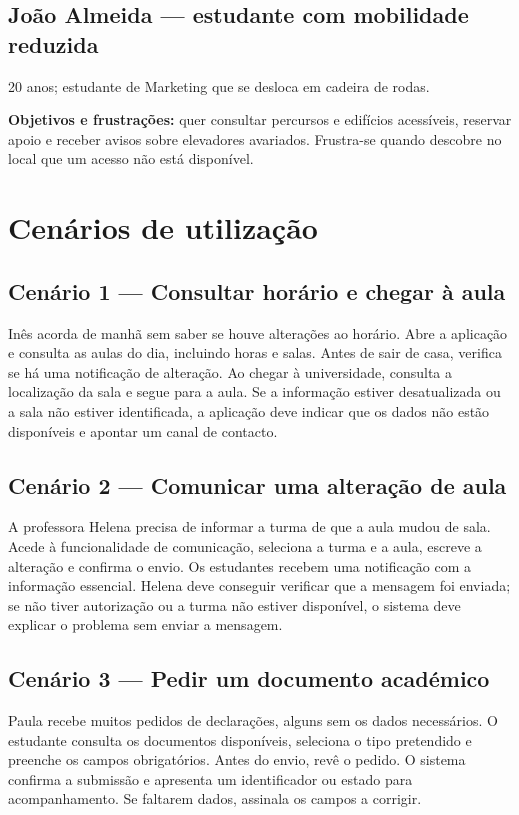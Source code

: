 \documentclass[12pt,a4paper]{article}
\begin{document}
\subsection{João Almeida --- estudante com mobilidade reduzida}
20 anos; estudante de Marketing que se desloca em cadeira de rodas.\par
\textbf{Objetivos e frustrações:} quer consultar percursos e edifícios acessíveis, reservar apoio e receber avisos sobre elevadores avariados. Frustra-se quando descobre no local que um acesso não está disponível.
\section{Cenários de utilização}
\subsection{Cenário 1 --- Consultar horário e chegar à aula}
Inês acorda de manhã sem saber se houve alterações ao horário. Abre a aplicação e consulta as aulas do dia, incluindo horas e salas. Antes de sair de casa, verifica se há uma notificação de alteração. Ao chegar à universidade, consulta a localização da sala e segue para a aula. Se a informação estiver desatualizada ou a sala não estiver identificada, a aplicação deve indicar que os dados não estão disponíveis e apontar um canal de contacto.
\subsection{Cenário 2 --- Comunicar uma alteração de aula}
A professora Helena precisa de informar a turma de que a aula mudou de sala. Acede à funcionalidade de comunicação, seleciona a turma e a aula, escreve a alteração e confirma o envio. Os estudantes recebem uma notificação com a informação essencial. Helena deve conseguir verificar que a mensagem foi enviada; se não tiver autorização ou a turma não estiver disponível, o sistema deve explicar o problema sem enviar a mensagem.
\subsection{Cenário 3 --- Pedir um documento académico}
Paula recebe muitos pedidos de declarações, alguns sem os dados necessários. O estudante consulta os documentos disponíveis, seleciona o tipo pretendido e preenche os campos obrigatórios. Antes do envio, revê o pedido. O sistema confirma a submissão e apresenta um identificador ou estado para acompanhamento. Se faltarem dados, assinala os campos a corrigir.
\end{document}
